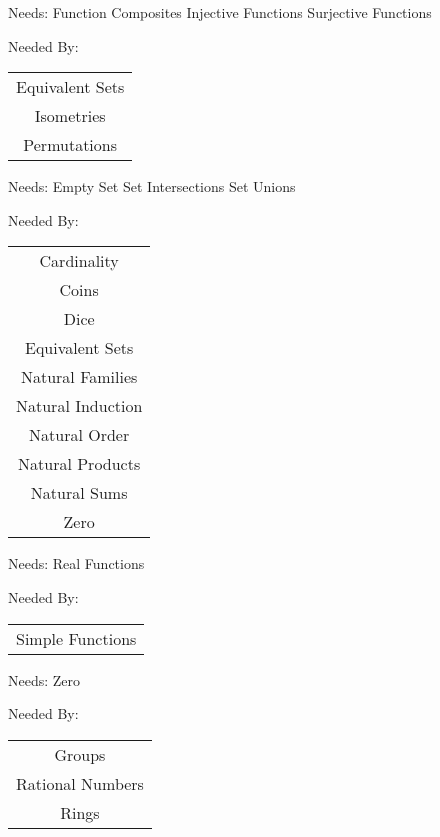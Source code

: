 \newpage
\label{function_inverses}


\clearpage
Needs:  Function Composites  Injective Functions  Surjective Functions 

Needed By: \begin{tabular}{c} Equivalent Sets \\  Isometries \\  Permutations \\ 
\end{tabular}
\clearpage{}

\newpage
\label{natural_numbers}


\clearpage
Needs:  Empty Set  Set Intersections  Set Unions 

Needed By: \begin{tabular}{c} Cardinality \\  Coins \\  Dice \\  Equivalent Sets \\  Natural Families \\  Natural Induction \\  Natural Order \\  Natural Products \\  Natural Sums \\  Zero \\ 
\end{tabular}
\clearpage{}

\newpage
\label{characteristic_functions}


\clearpage
Needs:  Real Functions 

Needed By: \begin{tabular}{c} Simple Functions \\ 
\end{tabular}
\clearpage{}

\newpage
\label{integer_numbers}


\clearpage
Needs:  Zero 

Needed By: \begin{tabular}{c} Groups \\  Rational Numbers \\  Rings \\ 
\end{tabular}
\clearpage{}


